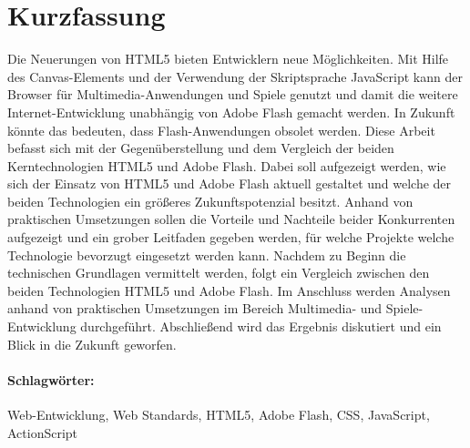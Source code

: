 \section*{Kurzfassung}\thispagestyle{empty}
Die Neuerungen von HTML5 bieten Entwicklern neue Möglichkeiten. Mit Hilfe des
Canvas-Elements und der Verwendung der Skriptsprache JavaScript kann der
Browser für Multimedia-Anwendungen und Spiele genutzt und damit die
weitere Internet-Entwicklung unabhängig von Adobe Flash gemacht werden.
In Zukunft könnte das bedeuten, dass Flash-Anwendungen obsolet werden.
\newline\newline
Diese Arbeit befasst sich mit der Gegenüberstellung und dem Vergleich der
beiden Kerntechnologien HTML5 und Adobe Flash. Dabei soll aufgezeigt werden,
wie sich der Einsatz von HTML5 und Adobe Flash aktuell gestaltet und welche
der beiden Technologien ein größeres Zukunftspotenzial besitzt. Anhand von
praktischen Umsetzungen sollen die Vorteile und Nachteile beider Konkurrenten
aufgezeigt und ein grober Leitfaden gegeben werden, für welche Projekte
welche Technologie bevorzugt eingesetzt werden kann.
\newline\newline
Nachdem zu Beginn die technischen Grundlagen vermittelt werden, folgt ein
Vergleich zwischen den beiden Technologien HTML5 und Adobe Flash.
Im Anschluss werden Analysen anhand von praktischen Umsetzungen im Bereich
Multimedia- und Spiele-Entwicklung durchgeführt. Abschließend wird das
Ergebnis diskutiert und ein Blick in die Zukunft geworfen.
\\ \vfill
\paragraph*{Schlagwörter:} Web-Entwicklung, Web Standards, HTML5,
Adobe Flash, CSS, JavaScript, ActionScript